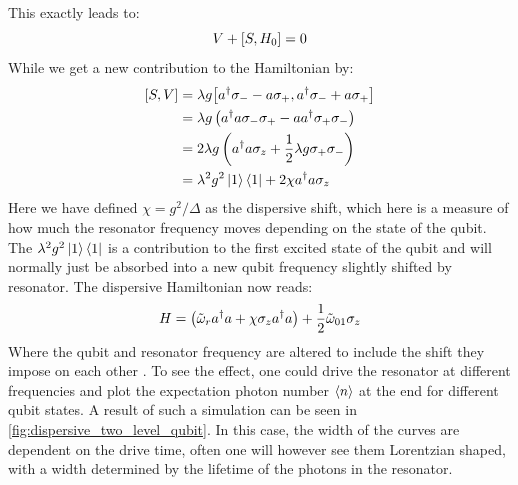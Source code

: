 This exactly leads to:
\begin{equation*}
    V + \comm{S}{H_0} = 0
\end{equation*}
While we get a new contribution to the Hamiltonian by:
\begin{align*}
    \comm{S}{V} &= \lambda g \comm{a^\dagger \sigma_- - a \sigma_+}{a^\dagger \sigma_- + a \sigma_+} \\
                &= \lambda g \left(a^\dagger a \sigma_- \sigma_+ - a a^\dagger \sigma_+ \sigma_-\right) \\
                &= 2 \lambda g \left(a^\dagger a \sigma_z + \frac12 \lambda g \sigma_+\sigma_-\right) \\
                &= \lambda^2 g^2 \ket{1}\bra{1} + 2 \chi a^\dagger a \sigma_z
\end{align*}
Here we have defined $\chi= g^2 / \Delta$ as the dispersive shift, which here is a measure of how much the resonator frequency moves depending on the state of the qubit. The $\lambda^2 g^2 \ket{1}\bra{1}$ is a contribution to the first excited state of the qubit and will normally just be absorbed into a new qubit frequency slightly shifted by resonator. The dispersive Hamiltonian now reads:
\begin{equation}
    H = \left(\Tilde{\omega}_r a^\dagger a + \chi \sigma_z a^\dagger a \right)  + \frac12 \Tilde{\omega}_{01} \sigma_z
\end{equation}
Where the qubit and resonator frequency are altered to include the shift they impose on each other \cite{boissonneault_dispersive_2009}. To see the effect, one could drive the resonator at different frequencies and plot the expectation photon number $\expval{n}$ at the end for different qubit states. A result of such a simulation can be seen in \ref{fig:dispersive_two_level_qubit}. In this case, the width of the curves are dependent on the drive time, often one will however see them Lorentzian shaped, with a width determined by the lifetime of the photons in the resonator.
